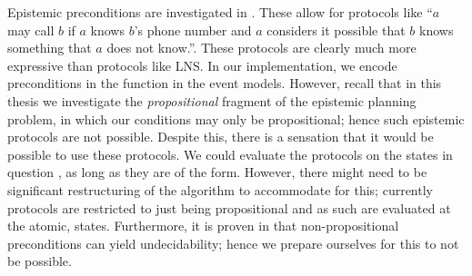 \documentclass[10pt, a4paper]{report}
\begin{document}
Epistemic preconditions are investigated in \cite{EpProforDyGo}. These allow for
protocols like ``$a$ may call $b$ if $a$ knows $b$'s phone number and $a$
considers it possible that $b$ knows something that $a$ does not know.''. These
protocols are clearly much more expressive than protocols like \textsf{LNS}. In
our implementation, we encode preconditions in the \tpre function in the event
models. However, recall that in this thesis we investigate the
\emph{propositional} fragment of the epistemic planning problem, in which our
\tpre conditions may only be propositional; hence such epistemic protocols are
not possible. Despite this, there is a sensation that it would be possible to
use these protocols. We could evaluate the protocols on the states in question
, as long as they are of the  form. However, there might need to be
significant restructuring of the algorithm to accommodate for this; currently
protocols are restricted to just being propositional and as such are evaluated
at the atomic,  states. Furthermore, it is proven in
\cite{UndecidabilityEP} that non-propositional preconditions can yield
undecidability; hence we prepare ourselves for this to not be possible. 


\newpage

\printbibliography[title={Bibliography}]
\end{document}
